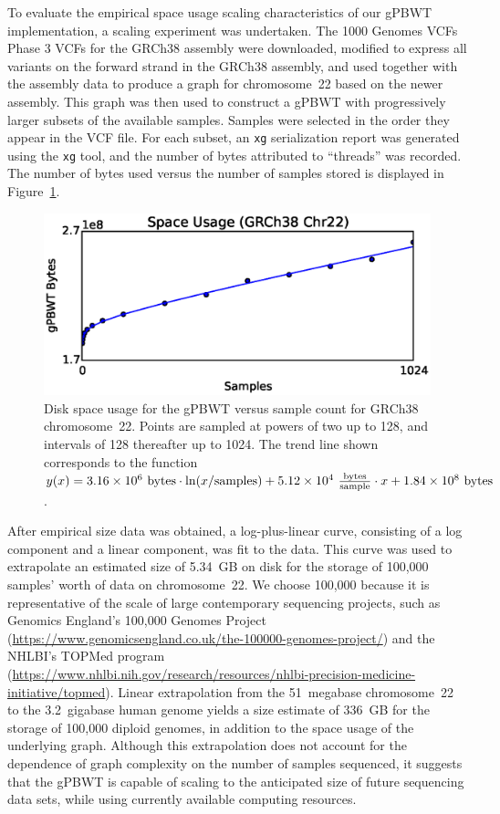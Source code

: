 To evaluate the empirical space usage scaling characteristics of our gPBWT implementation, a scaling experiment was undertaken. The 1000 Genomes VCFs Phase 3 VCFs for the GRCh38 assembly were downloaded, modified to express all variants on the forward strand in the GRCh38 assembly, and used together with the assembly data to produce a graph for chromosome~22 based on the newer assembly. This graph was then used to construct a gPBWT with progressively larger subsets of the available samples. Samples were selected in the order they appear in the VCF file. For each subset, an \texttt{xg} serialization report was generated using the \texttt{xg} tool, and the number of bytes attributed to ``threads'' was recorded. The number of bytes used versus the number of samples stored is displayed in Figure~\ref{fig:scaling}.

\begin{figure}[h!]
\centering
\includegraphics[width=\linewidth]{figures/03_gpbwt/scaling.eps}
\caption[Disk space usage for the gPBWT]{Disk space usage for the gPBWT versus sample count for GRCh38 chromosome~22. Points are sampled at powers of two up to 128, and intervals of 128 thereafter up to 1024. The trend line shown corresponds to the function $y(x) = \num{3.16E6}~\mathrm{bytes} \cdot \ln(x / \mathrm{samples}) + \num{5.12E4}~\frac{\mathrm{bytes}}{\mathrm{sample}} \cdot x + \num{1.84E8}~\mathrm{bytes}$.}
\label{fig:scaling}
\end{figure}

After empirical size data was obtained, a log-plus-linear curve, consisting of a log component and a linear component, was fit to the data. This curve was used to extrapolate an estimated size of 5.34~GB on disk for the storage of 100,000 samples' worth of data on chromosome~22. We choose 100,000 because it is representative of the scale of large contemporary sequencing projects, such as Genomics England's 100,000 Genomes Project (\url{https://www.genomicsengland.co.uk/the-100000-genomes-project/}) \cite{nothaft2015rethinking} and the NHLBI's TOPMed program (\url{https://www.nhlbi.nih.gov/research/resources/nhlbi-precision-medicine-initiative/topmed}). Linear extrapolation from the 51~megabase chromosome~22 to the 3.2~gigabase human genome yields a size estimate of 336~GB for the storage of 100,000 diploid genomes, in addition to the space usage of the underlying graph. Although this extrapolation does not account for the dependence of graph complexity on the number of samples sequenced, it suggests that the gPBWT is capable of scaling to the anticipated size of future sequencing data sets, while using currently available computing resources.

